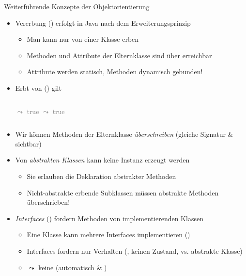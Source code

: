 {\begin{frame}[fragile,c]{Weiterführende Konzepte der Objektorientierung}
\vspace*{-.66\baselineskip}%
\begin{itemize}[<+(1)->]
    \itemsep4pt
    \item Vererbung () erfolgt in Java nach dem Erweiterungsprinzip \begin{itemize}
        \item Man kann nur von einer Klasse erben 
        \item Methoden und Attribute der Elternklasse sind über  erreichbar
        \item Attribute werden statisch, Methoden dynamisch gebunden!
    \end{itemize}
    \item Erbt  von  () gilt 
\begin{columns}[c]
 \textcolor{gray}{\scriptsize$\leadsto$ true}
 \textcolor{gray}{\scriptsize$\leadsto$ true}
\end{columns}
    \item Wir können Methoden der Elternklasse \textit{überschreiben} (gleiche Signatur \& sichtbar)
    \item Von \textit{abstrakten Klassen} kann keine Instanz erzeugt werden \begin{itemize}
        \item Sie erlauben die Deklaration abstrakter Methoden
        \item Nicht-abstrakte erbende Subklassen müssen abstrakte Methoden überschrieben!
    \end{itemize}
    \item \textit{Interfaces} () fordern Methoden von implementierenden Klassen \begin{itemize}
        \item Eine Klasse kann mehrere Interfaces implementieren ()
        \item Interfaces fordern nur Verhalten (, keinen Zustand, vs. abstrakte Klasse)
        \item $\leadsto$ keine  (automatisch  \& )
    \end{itemize}
\end{itemize}
\end{frame}
}\fi


\iffull\fi
